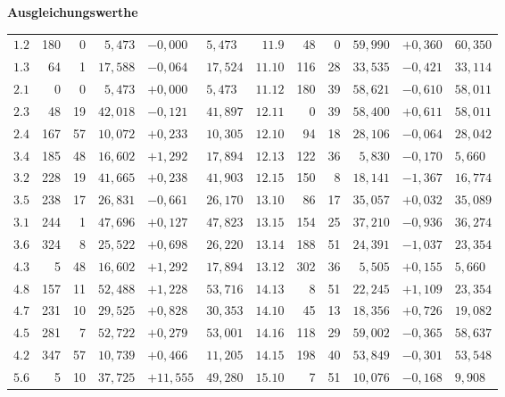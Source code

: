 \documentclass[12pt,a4paper]{article}
\theoremstyle{plain}
\theoremstyle{definition}
\theoremstyle{remark}
\begin{document}
\small
\begin{center}
\textbf{Ausgleichungswerthe}

\medskip
\begin{tabular}{r|r|r|r|l|l|r|r|r|r|l|l}
\hline
\hline
\hline
\hline
\hline
$1.2$ & 180 & 0 & $5{,}473$ & $-0{,}000$ & $5{,}473$ & $11.9$ & 48 & 0 & $59{,}990$ & $+0{,}360$ & $60{,}350$\\
$1.3$ & 64 & 1 & $17{,}588$ & $-0{,}064$ & $17{,}524$ & $11.10$ & 116 & 28 & $33{,}535$ & $-0{,}421$ & $33{,}114$\\
$2.1$ & 0 & 0 & $5{,}473$ & $+0{,}000$ & $5{,}473$ & $11.12$ & 180 & 39 & $58{,}621$ & $-0{,}610$ & $58{,}011$\\
$2.3$ & 48 & 19 & $42{,}018$ & $-0{,}121$ & $41{,}897$ & $12.11$ & 0 & 39 & $58{,}400$ & $+0{,}611$ & $58{,}011$\\
$2.4$ & 167 & 57 & $10{,}072$ & $+0{,}233$ & $10{,}305$ & $12.10$ & 94 & 18 & $28{,}106$ & $-0{,}064$ & $28{,}042$\\
$3.4$ & 185 & 48 & $16{,}602$ & $+1{,}292$ & $17{,}894$ & $12.13$ & 122 & 36 & $5{,}830$ & $-0{,}170$ & $5{,}660$\\
$3.2$ & 228 & 19 & $41{,}665$ & $+0{,}238$ & $41{,}903$ & $12.15$ & 150 & 8 & $18{,}141$ & $-1{,}367$ & $16{,}774$\\
$3.5$ & 238 & 17 & $26{,}831$ & $-0{,}661$ & $26{,}170$ & $13.10$ & 86 & 17 & $35{,}057$ & $+0{,}032$ & $35{,}089$\\
$3.1$ & 244 & 1 & $47{,}696$ & $+0{,}127$ & $47{,}823$ & $13.15$ & 154 & 25 & $37{,}210$ & $-0{,}936$ & $36{,}274$\\
$3.6$ & 324 & 8 & $25{,}522$ & $+0{,}698$ & $26{,}220$ & $13.14$ & 188 & 51 & $24{,}391$ & $-1{,}037$ & $23{,}354$\\
$4.3$ & 5 & 48 & $16{,}602$ & $+1{,}292$ & $17{,}894$ & $13.12$ & 302 & 36 & $5{,}505$ & $+0{,}155$ & $5{,}660$\\
$4.8$ & 157 & 11 & $52{,}488$ & $+1{,}228$ & $53{,}716$ & $14.13$ & 8 & 51 & $22{,}245$ & $+1{,}109$ & $23{,}354$\\
$4.7$ & 231 & 10 & $29{,}525$ & $+0{,}828$ & $30{,}353$ & $14.10$ & 45 & 13 & $18{,}356$ & $+0{,}726$ & $19{,}082$\\
$4.5$ & 281 & 7 & $52{,}722$ & $+0{,}279$ & $53{,}001$ & $14.16$ & 118 & 29 & $59{,}002$ & $-0{,}365$ & $58{,}637$\\
$4.2$ & 347 & 57 & $10{,}739$ & $+0{,}466$ & $11{,}205$ & $14.15$ & 198 & 40 & $53{,}849$ & $-0{,}301$ & $53{,}548$\\
$5.6$ & 5 & 10 & $37{,}725$ & $+11{,}555$ & $49{,}280$ & $15.10$ & 7 & 51 & $10{,}076$ & $-0{,}168$ & $9{,}908$\\

\end{tabular}
\end{center}
\end{document}
